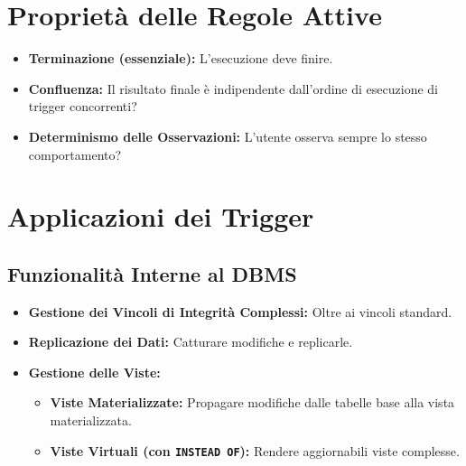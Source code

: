 \documentclass{article}
\begin{document}
	\section{Proprietà delle Regole Attive}
	\begin{itemize}
		\item \textbf{Terminazione (essenziale):} L'esecuzione deve finire.
		\item \textbf{Confluenza:} Il risultato finale è indipendente dall'ordine di esecuzione di trigger concorrenti?
		\item \textbf{Determinismo delle Osservazioni:} L'utente osserva sempre lo stesso comportamento?
	\end{itemize}
	
	\section{Applicazioni dei Trigger}
	\subsection{Funzionalità Interne al DBMS}
	\begin{itemize}
		\item \textbf{Gestione dei Vincoli di Integrità Complessi:} Oltre ai vincoli standard.
		\item \textbf{Replicazione dei Dati:} Catturare modifiche e replicarle.
		\item \textbf{Gestione delle Viste:}
		\begin{itemize}
			\item \textbf{Viste Materializzate:} Propagare modifiche dalle tabelle base alla vista materializzata.
			\item \textbf{Viste Virtuali (con \texttt{INSTEAD OF}):} Rendere aggiornabili viste complesse.
		\end{itemize}
	\end{itemize}
	
\end{document}
